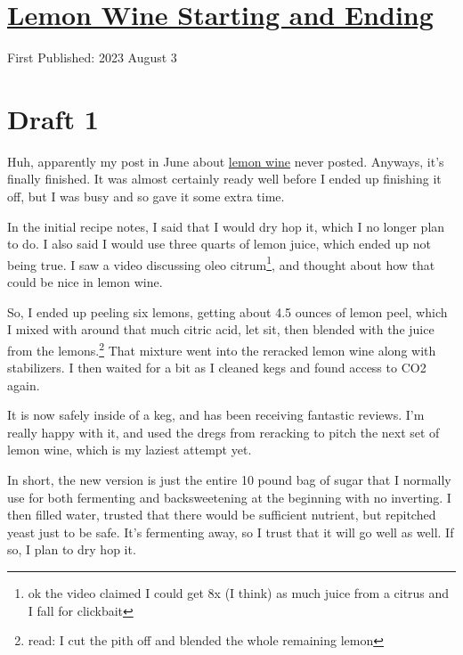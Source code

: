 \documentclass[12pt]{article}[titlepage]
\newcommand{\1}{\={a}}
\newcommand{\2}{\={e}}
\newcommand{\3}{\={\i}}
\newcommand{\4}{\=o}
\newcommand{\5}{\=u}
\newcommand{\6}{\={A}}
\renewcommand{\,}{\textsuperscript{,}}
\begin{document}
\doublespacing
\section{\href{lemon-wine-2.html}{Lemon Wine Starting and Ending}}
First Published: 2023 August 3


\section{Draft 1}
Huh, apparently my post in June about \href{lemon-wine-2.hmtl}{lemon wine} never posted.
Anyways, it's finally finished.
It was almost certainly ready well before I ended up finishing it off, but I was busy and so gave it some extra time.

In the initial recipe notes, I said that I would dry hop it, which I no longer plan to do.
I also said I would use three quarts of lemon juice, which ended up not being true.
I saw a video discussing oleo citrum\footnote{ok the video claimed I could get 8x (I think) as much juice from a citrus and I fall for clickbait}, and thought about how that could be nice in lemon wine.

So, I ended up peeling six lemons, getting about 4.5 ounces of lemon peel, which I mixed with around that much citric acid, let sit, then blended with the juice from the lemons.\footnote{read: I cut the pith off and blended the whole remaining lemon}
That mixture went into the reracked lemon wine along with stabilizers.
I then waited for a bit as I cleaned kegs and found access to CO2 again.

It is now safely inside of a keg, and has been receiving fantastic reviews.
I'm really happy with it, and used the dregs from reracking to pitch the next set of lemon wine, which is my laziest attempt yet.

In short, the new version is just the entire 10 pound bag of sugar that I normally use for both fermenting and backsweetening at the beginning with no inverting.
I then filled water, trusted that there would be sufficient nutrient, but repitched yeast just to be safe.
It's fermenting away, so I trust that it will go well as well.
If so, I plan to dry hop it.
\end{document}
